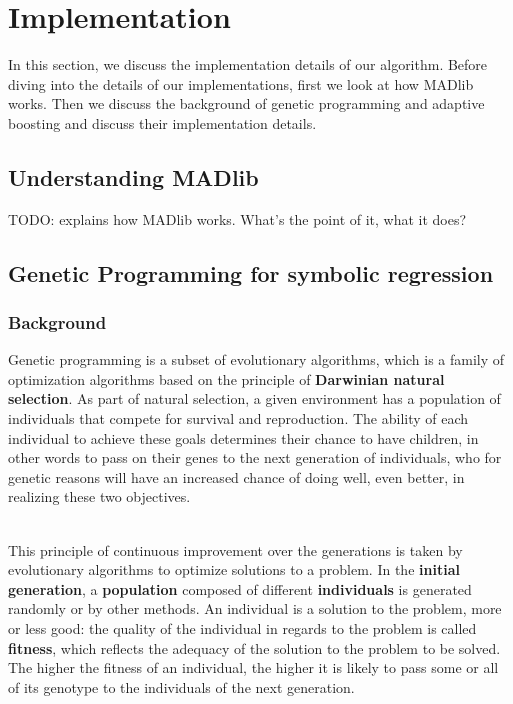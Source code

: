 
\section{Implementation}
\label{sec:imp}
In this section, we discuss the implementation details of our algorithm. Before diving into the details of our implementations, first we look at how MADlib works. Then we discuss the background of genetic programming and adaptive boosting and discuss their implementation details.
\subsection{Understanding MADlib}

TODO: explains how MADlib works. What's the point of it, what it does?

\subsection{Genetic Programming for symbolic regression}
\subsubsection{Background}

Genetic programming is a subset of evolutionary algorithms, which is a family of optimization algorithms based on the principle of \textbf{Darwinian natural selection}. As part of natural selection, a given environment has a population of individuals that compete for survival and reproduction. The ability of each individual to achieve these goals determines their chance to have children, in other words to pass on their genes to the next generation of individuals, who for genetic reasons will have an increased chance of doing well, even better, in realizing these two objectives.

~~\\
This principle of continuous improvement over the generations is taken by evolutionary algorithms to optimize solutions to a problem. In the \textbf {initial generation}, a \textbf{population} composed of different \textbf {individuals} is generated randomly or by other methods. An individual is a solution to the problem, more or less good: the quality of the individual in regards to the problem is called \textbf{fitness}, which reflects the adequacy of the solution to the problem to be solved. The higher the fitness of an individual, the higher it is likely to pass some or all of its genotype to the individuals of the next generation.

